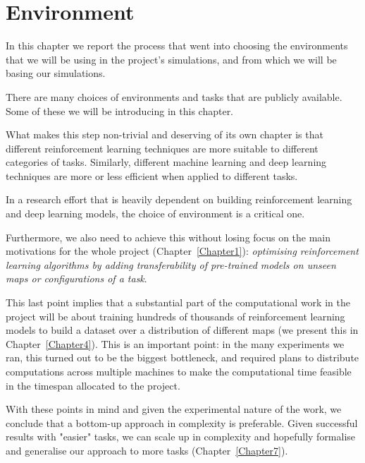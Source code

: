 
\chapter{Environment} %

\label{Chapter3} %


In this chapter we report the process that went into choosing the environments that we will be using in the project's simulations, and from which we will be basing our simulations.

There are many choices of environments and tasks that are publicly available. Some of these we will be introducing in this chapter.

What makes this step non-trivial and deserving of its own chapter is that different reinforcement learning techniques are more suitable to different categories of tasks. Similarly, different machine learning and deep learning techniques are more or less efficient when applied to different tasks.

In a research effort that is heavily dependent on building reinforcement learning and deep learning models, the choice of environment is a critical one.

Furthermore, we also need to achieve this without losing focus on the main motivations for the whole project (Chapter~\ref{Chapter1}): \textit{optimising reinforcement learning algorithms by adding transferability of pre-trained models on unseen maps or configurations of a task}.

This last point implies that a substantial part of the computational work in the project will be about training hundreds of thousands of reinforcement learning models to build a dataset over a distribution of different maps (we present this in Chapter~\ref{Chapter4}). This is an important point: in the many experiments we ran, this turned out to be the biggest bottleneck, and required plans to distribute computations across multiple machines to make the computational time feasible in the timespan allocated to the project.

With these points in mind and given the experimental nature of the work, we conclude that a bottom-up approach in complexity is preferable. Given successful results with "easier" tasks, we can scale up in complexity and hopefully formalise and generalise our approach to more tasks (Chapter~\ref{Chapter7}).

